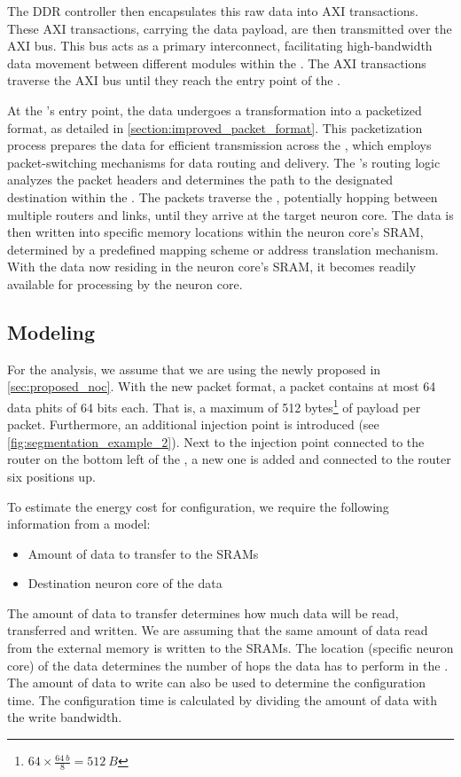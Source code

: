 The DDR controller then encapsulates this raw data into AXI transactions.
These AXI transactions, carrying the data payload, are then transmitted over the AXI bus.
This bus acts as a primary interconnect, facilitating high-bandwidth data movement between different modules within the \graicore{}.
The AXI transactions traverse the AXI bus until they reach the entry point of the \confignoc{}.

At the \confignoc{}'s entry point, the data undergoes a transformation into a packetized format, as detailed in \cref{section:improved_packet_format}.
This packetization process prepares the data for efficient transmission across the \confignoc{}, which employs packet-switching mechanisms for data routing and delivery.
The \confignoc{}'s routing logic analyzes the packet headers and determines the path to the designated destination within the \graicore{}.
The packets traverse the \confignoc{}, potentially hopping between multiple routers and links, until they arrive at the target neuron core.
The data is then written into specific memory locations within the neuron core's SRAM, determined by a predefined mapping scheme or address translation mechanism.
With the data now residing in the neuron core's SRAM, it becomes readily available for processing by the neuron core.

\subsection{Modeling}
For the analysis, we assume that we are using the newly proposed \confignoc{} in \cref{sec:proposed_noc}. 
With the new packet format, a packet contains at most 64 data phits of 64 bits each.
That is, a maximum of 512 bytes\footnote{$64 \times \frac{\SI{64}{b}}{8} = \SI{512}{B}$} of payload per packet.
Furthermore, an additional injection point is introduced (see \cref{fig:segmentation_example_2}).
Next to the injection point connected to the router on the bottom left of the \confignoc{}, a new one is added and connected to the router six positions up.

To estimate the energy cost for configuration, we require the following information from a model:
\begin{itemize}
    \item Amount of data to transfer to the SRAMs
    \item Destination neuron core of the data
\end{itemize}

The amount of data to transfer determines how much data will be read, transferred and written.
We are assuming that the same amount of data read from the external memory is written to the SRAMs.
The location (specific neuron core) of the data determines the number of hops the data has to perform in the \confignoc{}.
The amount of data to write can also be used to determine the configuration time.
The configuration time is calculated by dividing the amount of data with the write bandwidth.

